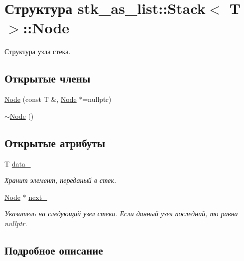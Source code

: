 \hypertarget{structstk__as__list_1_1_stack_1_1_node}{}\section{Структура stk\+\_\+as\+\_\+list\+:\+:Stack$<$ T $>$\+:\+:Node}
\label{structstk__as__list_1_1_stack_1_1_node}


Структура узла стека.  


\subsection*{Открытые члены}
\begin{DoxyCompactItemize}
\item 
\hyperlink{structstk__as__list_1_1_stack_1_1_node_a252875375c36553e0ced6331a731c19e}{Node} (const T \&, \hyperlink{structstk__as__list_1_1_stack_1_1_node}{Node} $\ast$=nullptr)
\item 
\hyperlink{structstk__as__list_1_1_stack_1_1_node_a04e480b19d2c55a2a551be7acd56d809}{$\sim$\+Node} ()
\end{DoxyCompactItemize}
\subsection*{Открытые атрибуты}
\begin{DoxyCompactItemize}
\item 
T \hyperlink{structstk__as__list_1_1_stack_1_1_node_a98a491bef8f5531040d0ccca743d33d4}{data\+\_\+}
\begin{DoxyCompactList}\small\item\em Хранит элемент, переданый в стек. \end{DoxyCompactList}\item 
\hyperlink{structstk__as__list_1_1_stack_1_1_node}{Node} $\ast$ \hyperlink{structstk__as__list_1_1_stack_1_1_node_a69f6ea733b172f044b13d1f2018565a0}{next\+\_\+}
\begin{DoxyCompactList}\small\item\em Указатель на следующий узел стека. Если данный узел последний, то равна nullptr. \end{DoxyCompactList}\end{DoxyCompactItemize}


\subsection{Подробное описание}
